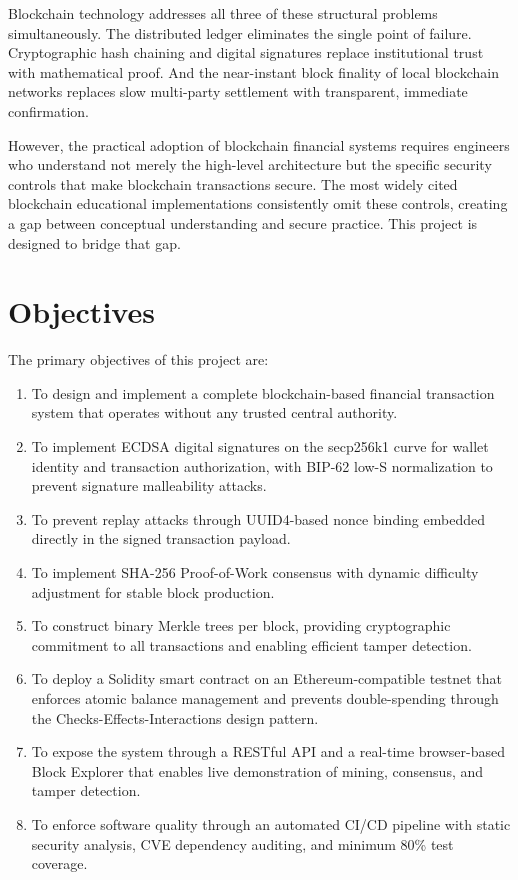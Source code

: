 \documentclass[12pt,a4paper]{report}
\begin{document}
Blockchain technology addresses all three of these structural problems simultaneously. The
distributed ledger eliminates the single point of failure. Cryptographic hash chaining and
digital signatures replace institutional trust with mathematical proof. And the near-instant
block finality of local blockchain networks replaces slow multi-party settlement with
transparent, immediate confirmation.

However, the practical adoption of blockchain financial systems requires engineers who
understand not merely the high-level architecture but the specific security controls that
make blockchain transactions secure. The most widely cited blockchain educational
implementations consistently omit these controls, creating a gap between conceptual
understanding and secure practice. This project is designed to bridge that gap.

\section{Objectives}

The primary objectives of this project are:

\begin{enumerate}[label=\arabic*.]
  \item To design and implement a complete blockchain-based financial transaction system
        that operates without any trusted central authority.
  \item To implement ECDSA digital signatures on the secp256k1 curve for wallet identity
        and transaction authorization, with BIP-62 low-S normalization to prevent signature
        malleability attacks.
  \item To prevent replay attacks through UUID4-based nonce binding embedded directly in
        the signed transaction payload.
  \item To implement SHA-256 Proof-of-Work consensus with dynamic difficulty adjustment
        for stable block production.
  \item To construct binary Merkle trees per block, providing cryptographic commitment to
        all transactions and enabling efficient tamper detection.
  \item To deploy a Solidity smart contract on an Ethereum-compatible testnet that enforces
        atomic balance management and prevents double-spending through the
        Checks-Effects-Interactions design pattern.
  \item To expose the system through a RESTful API and a real-time browser-based Block
        Explorer that enables live demonstration of mining, consensus, and tamper detection.
  \item To enforce software quality through an automated CI/CD pipeline with static security
        analysis, CVE dependency auditing, and minimum 80\% test coverage.
\end{enumerate}
\end{document}
